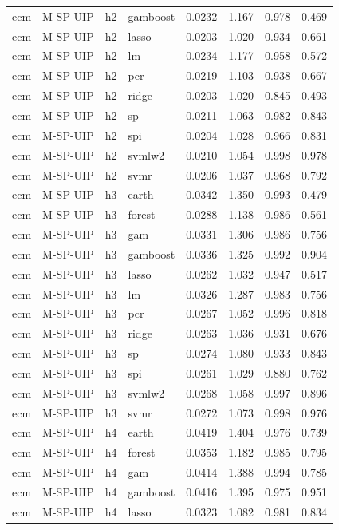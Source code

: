 \begin{ThreePartTable}
\begin{longtable}[t]{llclcccc}
ecm & M-SP-UIP & h2 & gamboost & 0.0232 & 1.167 & 0.978 & 0.469\\
ecm & M-SP-UIP & h2 & lasso & 0.0203 & 1.020 & 0.934 & 0.661\\
ecm & M-SP-UIP & h2 & lm & 0.0234 & 1.177 & 0.958 & 0.572\\
ecm & M-SP-UIP & h2 & pcr & 0.0219 & 1.103 & 0.938 & 0.667\\
ecm & M-SP-UIP & h2 & ridge & 0.0203 & 1.020 & 0.845 & 0.493\\
ecm & M-SP-UIP & h2 & sp & 0.0211 & 1.063 & 0.982 & 0.843\\
ecm & M-SP-UIP & h2 & spi & 0.0204 & 1.028 & 0.966 & 0.831\\
ecm & M-SP-UIP & h2 & svmlw2 & 0.0210 & 1.054 & 0.998 & 0.978\\
ecm & M-SP-UIP & h2 & svmr & 0.0206 & 1.037 & 0.968 & 0.792\\
\addlinespace
ecm & M-SP-UIP & h3 & earth & 0.0342 & 1.350 & 0.993 & 0.479\\
ecm & M-SP-UIP & h3 & forest & 0.0288 & 1.138 & 0.986 & 0.561\\
ecm & M-SP-UIP & h3 & gam & 0.0331 & 1.306 & 0.986 & 0.756\\
ecm & M-SP-UIP & h3 & gamboost & 0.0336 & 1.325 & 0.992 & 0.904\\
ecm & M-SP-UIP & h3 & lasso & 0.0262 & 1.032 & 0.947 & 0.517\\
ecm & M-SP-UIP & h3 & lm & 0.0326 & 1.287 & 0.983 & 0.756\\
ecm & M-SP-UIP & h3 & pcr & 0.0267 & 1.052 & 0.996 & 0.818\\
ecm & M-SP-UIP & h3 & ridge & 0.0263 & 1.036 & 0.931 & 0.676\\
ecm & M-SP-UIP & h3 & sp & 0.0274 & 1.080 & 0.933 & 0.843\\
ecm & M-SP-UIP & h3 & spi & 0.0261 & 1.029 & 0.880 & 0.762\\
ecm & M-SP-UIP & h3 & svmlw2 & 0.0268 & 1.058 & 0.997 & 0.896\\
ecm & M-SP-UIP & h3 & svmr & 0.0272 & 1.073 & 0.998 & 0.976\\
\addlinespace
ecm & M-SP-UIP & h4 & earth & 0.0419 & 1.404 & 0.976 & 0.739\\
ecm & M-SP-UIP & h4 & forest & 0.0353 & 1.182 & 0.985 & 0.795\\
ecm & M-SP-UIP & h4 & gam & 0.0414 & 1.388 & 0.994 & 0.785\\
ecm & M-SP-UIP & h4 & gamboost & 0.0416 & 1.395 & 0.975 & 0.951\\
ecm & M-SP-UIP & h4 & lasso & 0.0323 & 1.082 & 0.981 & 0.834\\

\end{longtable}
\end{ThreePartTable}
